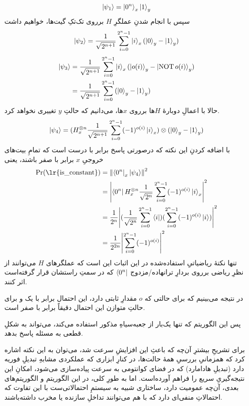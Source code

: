 \begin{equation}
    \ket{\psi_1} = \ket{0^n}_x \ket{1}_y
\end{equation}
سپس با انجام شدنِ عملگرِ \(H\) برروی تک‌تکِ گیت‌ها، خواهیم داشت
\begin{equation}
    \ket{\psi_2} = \frac{1}{\sqrt{2^{n+1}}}\sum_{i = 0}^{2^n - 1} \ket{i}_x (\ket{0}_y - \ket{1}_y)
\end{equation}
\begin{align}
    \ket{\psi_3} &= \frac{1}{\sqrt{2^{n+1}}}\sum_{i = 0}^{2^n - 1} \ket{i}_x (\ket{o(i)}_y - \ket{\operatorname{NOT} o(i)}_y) \\
     &= \frac{1}{\sqrt{2^{n+1}}}\sum_{i = 0}^{2^n - 1}(\ket{0}_y - \ket{1}_y)
\end{align}
حالا با اعمالِ دوبارهٔ \(H\)ها برروی \(x\)ها، می‌دانیم که حالتِ \(y\) تغییری نخواهد کرد.
\begin{equation}
    \ket{\psi_4} = (H^{\otimes n}_x \frac{1}{\sqrt{2^{n+1}}}\sum_{i = 0}^{2^n - 1}  (-1)^{o(i)}\ket{i}_x ) \otimes (\ket{0}_y - \ket{1}_y)
\end{equation}
با اضافه کردنِ این نکته که درصورتی پاسخ 
برابر با درست است که تمامِ بیت‌های خروجیِ \(x\) برابر با صفر باشند، یعنی
\begin{align}
    \Pr(\text{\lr{\lstinline{is_constant}}}) &= \norm{\bra{0^n}_x \ket{\psi_4}}^2 \\
     &= \abs{\bra{0^n}H^{\otimes n}_x \frac{1}{\sqrt{2^{n}}}\sum_{i = 0}^{2^n - 1}  (-1)^{o(i)}\ket{i}_x}^2 \\
     &= \frac{1}{2^n}\abs{(\frac{1}{\sqrt{2^{n}}}\sum_{i = 0}^{2^n - 1} \bra{i}) (\sum_{i = 0}^{2^n - 1}  (-1)^{o(i)}\ket{i})}^2 \\
     &= \frac{1}{2^{2n}}\abs{\sum_{i = 0}^{2^n - 1} (-1)^{o(i)}}^2
\end{align}
تنها نکتهٔ ریاضیاتیِ استفاده‌شده در این اثبات این است که عملگرهای \(H\) می‌توانند از نظرِ ریاضی برروی بردارِ ترانهاده/مزدوج 
\( \bra{0^n} \)
که در سمتِ راستشان قرار گرفته‌است اثر کنند.

در نتیجه می‌بینیم که برای حالتی که \(o\) مقدارِ ثابتی دارد، این احتمال برابر با یک و برای حالتِ متوازن این احتمال دقیقاً برابر با صفر است.

پس این الگوریتم که تنها یک‌بار از جعبه‌سیاهِ مذکور استفاده می‌کند، می‌تواند به شکلِ قطعی به مسئله پاسخ بدهد.

برای تشریحِ بیشترِ آن‌چه که باعثِ این افزایشِ سرعت شد، می‌توان به این نکته اشاره کرد که همزمانیِ بررسیِ همهٔ حالت‌ها، در کنارِ ابزاری که عملکردی مشابهِ تبدیلِ فوریه دارد (تبدیلِ هادامارد) که در فضای کوانتومی به سرعت پیاده‌سازی می‌شود، امکانِ این نتیجه‌گیریِ سریع را فراهم آورده‌است. اما به طورِ کلی، در این الگوریتم و الگوریتم‌های بعدی، آن‌چه عمومیت دارد، ساختاری شبیه به سیستمِ احتمالاتی‌ست با این تفاوت که احتمالاتِ منفی‌ای دارد که با هم می‌توانند تداخلِ سازنده یا مخرب داشته‌باشند.

